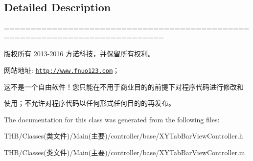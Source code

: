 \subsection{Detailed Description}
============================================================================

版权所有 2013-\/2016 方诺科技，并保留所有权利。

网站地址\+: \href{http://www.fnuo123.com}{\tt http\+://www.\+fnuo123.\+com}； 



这不是一个自由软件！您只能在不用于商业目的的前提下对程序代码进行修改和

使用；不允许对程序代码以任何形式任何目的的再发布。 

 

The documentation for this class was generated from the following files\+:\begin{DoxyCompactItemize}
\item 
T\+H\+B/\+Classes(类文件)/\+Main(主要)/controller/base/X\+Y\+Tab\+Bar\+View\+Controller.\+h\item 
T\+H\+B/\+Classes(类文件)/\+Main(主要)/controller/base/X\+Y\+Tab\+Bar\+View\+Controller.\+m\end{DoxyCompactItemize}
